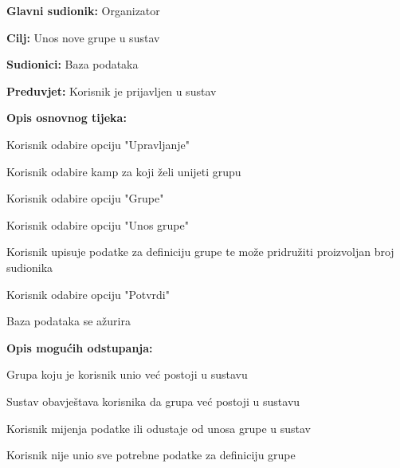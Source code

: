 					\noindent {}
					\begin{packed_item}
						
						\item \textbf{Glavni sudionik: }Organizator
						\item  \textbf{Cilj:} Unos nove grupe u sustav
						\item  \textbf{Sudionici:} Baza podataka
						\item  \textbf{Preduvjet:} Korisnik je prijavljen u sustav
						\item  \textbf{Opis osnovnog tijeka:}
						
						\item[] \begin{packed_enum}
							
							
							\item Korisnik odabire opciju "Upravljanje"
							\item Korisnik odabire kamp za koji želi unijeti grupu
							\item Korisnik odabire opciju "Grupe"
							\item Korisnik odabire opciju "Unos grupe"
							\item Korisnik upisuje podatke za definiciju grupe te može pridružiti proizvoljan broj sudionika 
							\item Korisnik odabire opciju "Potvrdi"
							\item Baza podataka se ažurira
						\end{packed_enum}
						
						\item  \textbf{Opis mogućih odstupanja:}
						
						\item[] \begin{packed_item}
							
							\item[2.a] Grupa koju je korisnik unio već postoji u sustavu
							\item[] \begin{packed_enum}
								
								\item Sustav obavještava korisnika da grupa već postoji u sustavu
								\item Korisnik mijenja podatke ili odustaje od unosa grupe u sustav 
								
								
							\end{packed_enum}
							\item[2.b] Korisnik nije unio sve potrebne podatke za definiciju grupe
							\item[] \begin{packed_enum}
								

\end{packed_enum}
\end{packed_item}
\end{packed_item}

